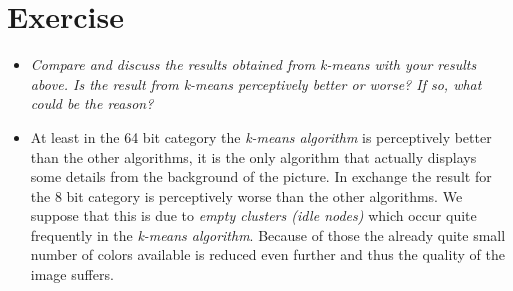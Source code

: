 \documentclass[a4paper]{image-gallery}
\begin{document}
    \section{Exercise}
  \begin{itemize}
  	\item \textit{Compare and discuss the results obtained from k-means with your results above. Is the
result from k-means perceptively better or worse? If so, what could be the reason?}
	\item At least in the 64 bit category the \textit{k-means algorithm} is perceptively better than the other algorithms, it is the only algorithm that actually displays some details from the background of the picture. In exchange the result for the 8 bit category is perceptively worse than the other algorithms. We suppose that this is due to \textit{empty clusters (idle nodes)} which occur quite frequently in the \textit{k-means algorithm}. Because of those the already quite small number of colors available is reduced even further and thus the quality of the image suffers.
  \end{itemize}
\end{document}
